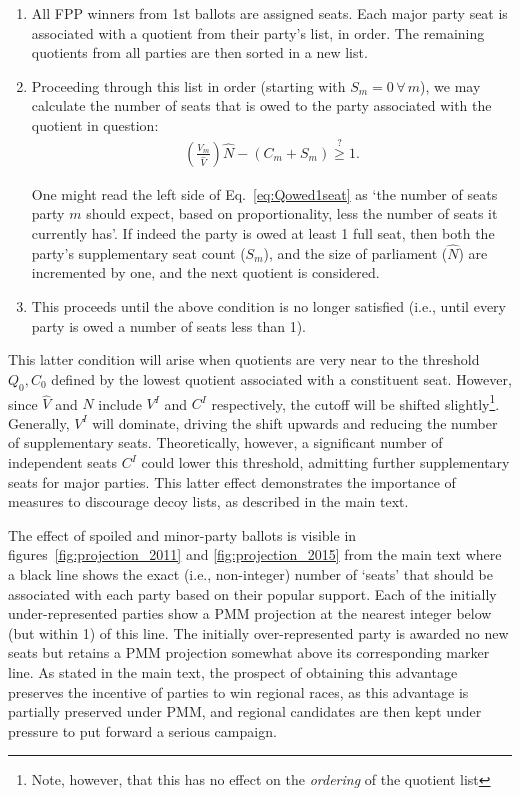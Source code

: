 \begin{enumerate}
\item All FPP winners from 1st ballots are assigned seats.
Each major party seat is associated with a quotient from their party's list, in order. The remaining quotients from all parties are then sorted in a new list.

\item Proceeding through this list in order (starting with $S_m=0 \, \forall \, m$), we may calculate the number of seats that is owed to the party associated with the quotient in question:
\begin{align}
\left(\frac{V_m}{\hat{V}}\right) \hat{N} -(C_m+S_m)\stackrel{?}{\ge} 1.
\label{eq:Qowed1seat}
\end{align}

One might read the left side of Eq.~\ref{eq:Qowed1seat} as `the number of seats party $m$ should expect, based on proportionality, less the number of seats it currently has'.
If indeed the party is owed at least 1 full seat, then both the party's supplementary seat count ($S_m$), and the size of parliament ($\hat{N}$) are incremented by one, and the next quotient is considered.

\item This proceeds until the above condition is no longer satisfied (i.e., until every party is owed a number of seats less than 1).
\end{enumerate}

This latter condition will arise when quotients are very near to the threshold $Q_0,C_0$ defined by the lowest quotient associated with a  constituent seat. However, since $\hat{V}$ and $\hat{N}$ include $V^I$ and $C^I$ respectively, the cutoff will be shifted slightly\footnote{Note, however, that this has no effect on the \emph{ordering} of the quotient list}.
Generally, $V^I$ will dominate, driving the shift upwards and reducing the number of supplementary seats.
Theoretically, however, a significant number of independent seats $C^I$ could lower this threshold, admitting further supplementary seats for major parties. 
This latter effect demonstrates the importance of measures to discourage decoy lists, as described in the main text.

The effect of spoiled and minor-party ballots is visible in figures~\ref{fig:projection_2011} and \ref{fig:projection_2015} from the main text where a black line shows the exact (i.e., non-integer) number of `seats' that should be associated with each party based on their popular support.
Each of the initially under-represented parties show a PMM projection at the nearest integer below (but within 1) of this line. The initially over-represented party is awarded no new seats but retains a PMM projection somewhat above its corresponding marker line.
As stated in the main text, the prospect of obtaining this advantage preserves the incentive of parties to win regional races, as this advantage is partially preserved under PMM, and regional candidates are then kept under pressure to put forward a serious campaign.

